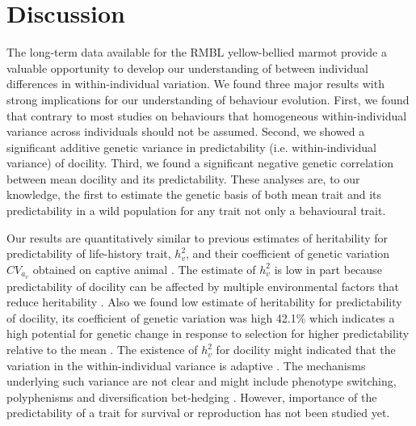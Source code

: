 \documentclass[a4paper,12pt,twoside]{article}
\begin{document}
	\section*{Discussion}
	The long-term data available for the RMBL yellow-bellied marmot provide a valuable opportunity to develop our understanding of between individual differences in within-individual variation.
	We found three major results with strong implications for our understanding of behaviour evolution.
	First, we found that contrary to most studies on behaviours that homogeneous within-individual variance across individuals should not be assumed.
	Second, we showed a significant additive genetic variance in predictability (i.e. within-individual variance) of docility.
	Third, we found a significant negative genetic correlation between mean docility and its predictability.
	These analyses are, to our knowledge, the first to estimate the genetic basis of both mean trait and its predictability in a wild population for any trait not only a behavioural trait. 
		
	Our results are quantitatively similar to previous estimates of heritability for predictability of life-history trait, $h_v^2$, and their coefficient of genetic variation $CV_{a_v}$ obtained on captive animal \citep{Hill2010}.
	The estimate of $h_v^2$ is low in part because predictability of docility can be affected by multiple environmental factors that reduce heritability \citep{Houle1992, Westneat2014}.
	Also we found low estimate of heritability for predictability of docility, its coefficient of genetic variation was high 42.1\% which indicates a high potential for genetic change in response to selection for higher predictability relative to the mean \citep{Mulder2007, Hill2010}.
	The existence of $h_v^2$ for docility might indicated that the variation in the within-individual variance is adaptive \citep{Westneat2014}.
	The mechanisms underlying such variance are not clear and might include phenotype switching, polyphenisms and diversification bet-hedging \citep{Westneat2014}.
	However, importance of the predictability of a trait for survival or reproduction has not been studied yet.
\end{document}
